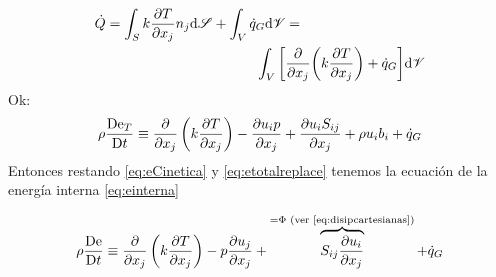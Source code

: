 \begin{align*}
    \dot{Q}=\int_S k\frac{\partial T}{\partial x_j} n_j \textrm{d} \mathscr{S} + \int_V \dot{q}_G \textrm{d} \mathscr{V} &=\\
    \int_V \bigg[ &\frac{\partial  }{\partial x_j} \bigg( k   \frac{\partial T}{\partial x_j} \bigg) + \dot{q}_G \bigg] \textrm{d} \mathscr{V}
\end{align*}
Ok:
\begin{equation} \label{eq:etotalreplace}
    \rho \frac{\textrm{D} \textrm{e}_T}{\textrm{D} t}\equiv \frac{\partial }{\partial x_j}\left(k\frac{\partial T}{\partial x_j}\right) - \frac{\partial u_i p}{\partial x_j}+\frac{\partial u_i S_{ij}}{\partial x_j}+\rho u_i b_i+\dot{q}_G
\end{equation}
Entonces restando \ref{eq:eCinetica} y \ref{eq:etotalreplace} tenemos la ecuación de la energía interna \ref{eq:einterna}

\begin{equation} \label{eq:einterna}
    \rho \frac{\textrm{D} \textrm{e}}{\textrm{D} t}\equiv \frac{\partial }{\partial x_j}\left( k\frac{\partial T}{\partial x_j}\right) - p \frac{\partial u_j}{\partial x_j} +\overbrace{S_{ij} \frac{\partial u_i}{\partial x_j}}^{=\Phi \textrm{ (ver \eqref{eq:disipcartesianas})}}+\dot{q}_G
\end{equation}